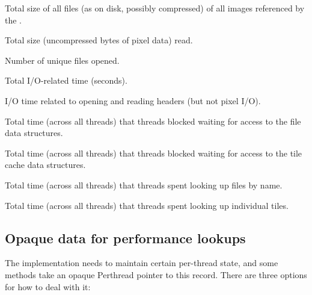 Total size of all files (as on disk, possibly compressed) of all images
referenced by the \ImageCache.
\apiend

Total size (uncompressed bytes of pixel data) read.
\apiend

Number of unique files opened.
\apiend

Total I/O-related time (seconds).
\apiend

I/O time related to opening and reading headers (but not pixel I/O).
\apiend

Total time (across all threads) that threads blocked waiting for access to
the file data structures.
\apiend

Total time (across all threads) that threads blocked waiting for access to
the tile cache data structures.
\apiend

Total time (across all threads) that threads spent looking up files by name.
\apiend

Total time (across all threads) that threads spent looking up individual tiles.
\apiend



\bigskip

\subsection{Opaque data for performance lookups}
\label{sec:imagecache:api:opaque}

 

The \ImageCache implementation needs to maintain certain per-thread
state, and some \ImageCache methods take an opaque {\cf Perthread} pointer
to this record. There are three options for how to deal with it:

